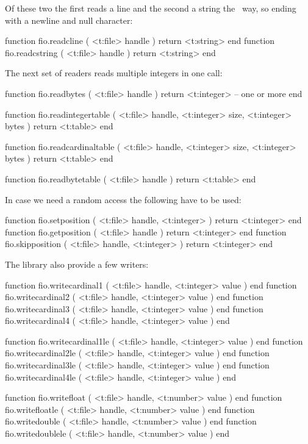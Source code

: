Of these two the first reads a line and the second a string the \CCODE\ way, so
ending with a newline and null character:

\starttyping[option=LUA]
function fio.readcline   ( <t:file> handle ) return <t:string> end
function fio.readcstring ( <t:file> handle ) return <t:string> end
\stoptyping

The next set of readers reads multiple integers in one call:

\starttyping[option=LUA]
function fio.readbytes (
    <t:file> handle
)
    return <t:integer> -- one or more
end
\stoptyping

\starttyping[option=LUA]
function fio.readintegertable (
    <t:file>    handle,
    <t:integer> size,
    <t:integer> bytes
)
    return <t:table>
end

function fio.readcardinaltable (
    <t:file>    handle,
    <t:integer> size,
    <t:integer> bytes
)
    return <t:table>
end

function fio.readbytetable (
    <t:file> handle
)
    return <t:table>
end
\stoptyping

In case we need a random access the following have to be used:

\starttyping[option=LUA]
function fio.setposition  ( <t:file> handle, <t:integer> ) return <t:integer> end
function fio.getposition  ( <t:file> handle              ) return <t:integer> end
function fio.skipposition ( <t:file> handle, <t:integer> ) return <t:integer> end
\stoptyping

The library also provide a few writers:

\starttyping[option=LUA]
function fio.writecardinal1 ( <t:file> handle, <t:integer> value ) end
function fio.writecardinal2 ( <t:file> handle, <t:integer> value ) end
function fio.writecardinal3 ( <t:file> handle, <t:integer> value ) end
function fio.writecardinal4 ( <t:file> handle, <t:integer> value ) end

function fio.writecardinal1le ( <t:file> handle, <t:integer> value ) end
function fio.writecardinal2le ( <t:file> handle, <t:integer> value ) end
function fio.writecardinal3le ( <t:file> handle, <t:integer> value ) end
function fio.writecardinal4le ( <t:file> handle, <t:integer> value ) end

function fio.writefloat    ( <t:file> handle, <t:number> value ) end
function fio.writefloatle  ( <t:file> handle, <t:number> value ) end
function fio.writedouble   ( <t:file> handle, <t:number> value ) end
function fio.writedoublele ( <t:file> handle, <t:number> value ) end
\stoptyping

